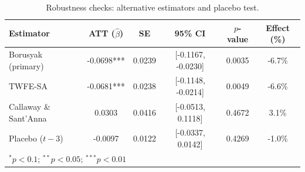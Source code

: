 \begin{table}[t]
\centering
\caption{Robustness checks: alternative estimators and placebo test.}
\label{tab:robustness}
\begin{tabular}{lccccc}
\toprule
Estimator & ATT ($\hat{\beta}$) & SE & 95\% CI & $p$-value & Effect (\%) \\
\midrule
Borusyak (primary) & -0.0698*** & 0.0239 & [-0.1167, -0.0230] & 0.0035 & -6.7\% \\
TWFE-SA & -0.0681*** & 0.0238 & [-0.1148, -0.0214] & 0.0049 & -6.6\% \\
Callaway \& Sant'Anna & 0.0303 & 0.0416 & [-0.0513, 0.1118] & 0.4672 & 3.1\% \\
Placebo ($t-3$) & -0.0097 & 0.0122 & [-0.0337, 0.0142] & 0.4269 & -1.0\% \\
\bottomrule
\multicolumn{6}{l}{\footnotesize $^{*}p<0.1$; $^{**}p<0.05$; $^{***}p<0.01$} \\
\end{tabular}
\end{table}
